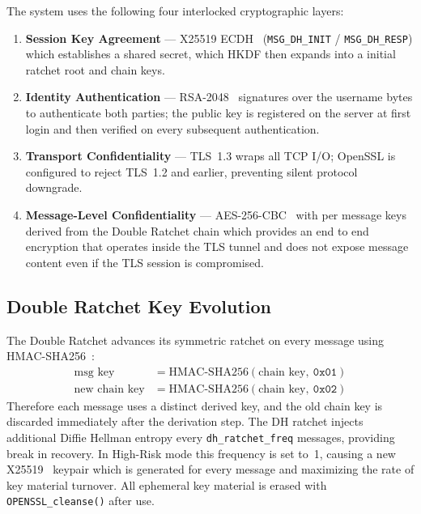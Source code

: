 \documentclass[conference]{IEEEtran}
\begin{document}
The system uses the following four interlocked cryptographic layers:

\begin{enumerate}
    \item \textbf{Session Key Agreement} --- X25519 ECDH~\cite{b7} (\texttt{MSG\_DH\_INIT} / \texttt{MSG\_DH\_RESP}) which establishes a shared secret, which HKDF \cite{b4} then expands into a initial ratchet root and chain keys.
    \item \textbf{Identity Authentication} --- RSA-2048~\cite{b9} signatures over the username bytes to authenticate both parties; the public key is registered on the server at first login and then verified on every subsequent authentication.
    \item \textbf{Transport Confidentiality} --- TLS~1.3 wraps all TCP I/O; OpenSSL is configured to reject TLS~1.2 and earlier, preventing silent protocol downgrade.
    \item \textbf{Message-Level Confidentiality} --- AES-256-CBC~\cite{b8} with per message keys derived from the Double Ratchet chain which provides an end to end encryption that operates inside the TLS tunnel and does not expose message content even if the TLS session is compromised.
\end{enumerate}

\subsection{Double Ratchet Key Evolution}

The Double Ratchet \cite{b1} advances its symmetric ratchet on every message using HMAC-SHA256~\cite{b10}:
\begin{align}
    \text{msg key} &= \text{HMAC-SHA256}(\text{chain key},\ \texttt{0x01}) \\
    \text{new chain key} &= \text{HMAC-SHA256}(\text{chain key},\ \texttt{0x02})
\end{align}
Therefore each message uses a distinct derived key, and the old chain key is discarded immediately after the derivation step. The DH ratchet injects additional Diffie Hellman entropy every \texttt{dh\_ratchet\_freq} messages, providing break in recovery. In High-Risk mode this frequency is set to~1, causing a new X25519~\cite{b7} keypair which is generated for every message and maximizing the rate of key material turnover. All ephemeral key material is erased with \texttt{OPENSSL\_cleanse()} after use.

\end{document}
